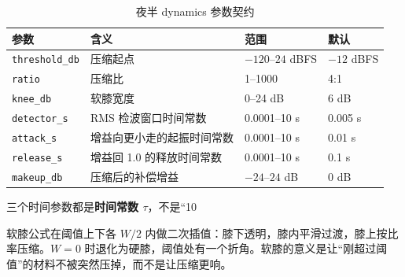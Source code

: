 \begin{center}
\end{center}

\begin{table}[htbp]
\centering
\small
\begin{tabular}{@{}llll@{}}
\hline
参数 & 含义 & 范围 & 默认 \\
\hline
\texttt{threshold\_db} & 压缩起点 & $-120$–$24$ dBFS & $-12$ dBFS \\
\texttt{ratio} & 压缩比 & 1–1000 & 4:1 \\
\texttt{knee\_db} & 软膝宽度 & 0–24 dB & 6 dB \\
\texttt{detector\_s} & RMS 检波窗口时间常数 & 0.0001–10 s & 0.005 s \\
\texttt{attack\_s} & 增益向更小走的起振时间常数 & 0.0001–10 s & 0.01 s \\
\texttt{release\_s} & 增益回 1.0 的释放时间常数 & 0.0001–10 s & 0.1 s \\
\texttt{makeup\_db} & 压缩后的补偿增益 & $-24$–$24$ dB & 0 dB \\
\hline
\end{tabular}
\caption{夜半 dynamics 参数契约}
\label{tab:comp-params}
\end{table}

三个时间参数都是\textbf{时间常数 $\tau$}，不是“10%

软膝公式在阈值上下各 $W/2$ 内做二次插值：膝下透明，膝内平滑过渡，膝上按比率压缩。$W=0$ 时退化为硬膝，阈值处有一个折角。软膝的意义是让“刚超过阈值”的材料不被突然压掉，而不是让压缩更响。

